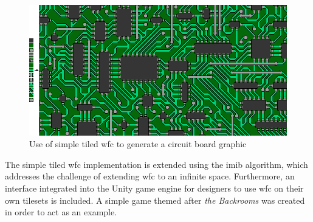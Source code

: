 \begin{figure}[H]
    \centering
    \includegraphics[width=\textwidth, height=0.3\textheight, keepaspectratio]{Images/circuit-1.png}
    \caption{Use of simple tiled \acrshort{wfc} to generate a circuit board graphic \cite{Gumin_Wave_Function_Collapse_2016}}
    \label{fig:WFCcircuit}
\end{figure}

The simple tiled \acrshort{wfc} implementation is extended using the \acrfull{imib} algorithm, which addresses the challenge of extending \acrshort{wfc} to an infinite space. Furthermore, an interface integrated into the Unity game engine for designers to use \acrshort{wfc} on their own tilesets is included. A simple game themed after \textit{the Backrooms} was created in order to act as an example.

